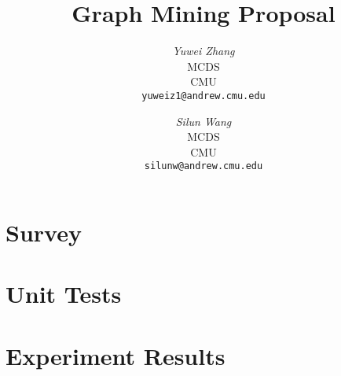 \documentclass[12pt]{article}
\begin{document}
\newcommand{\beq}{\begin{equation}}
\newcommand{\eeq}{\end{equation}}
\newcommand{\bit}{\begin{itemize*}}
\newcommand{\eit}{\end{itemize*}}
\newcommand{\goal}[1]{ {\noindent {$\Rightarrow$} \em {#1} } }
\newcommand{\hide}[1]{}
\newcommand{\comment}[1]{ {\footnotesize {#1} } }
\newtheorem{lemma}{Lemma}
\newtheorem{theorem}{Theorem}
\newtheorem{proof}{Proof}
\newtheorem{defn}{Definition}
\newtheorem{algo}{Algorithm}
\newtheorem{observation}{Observation}

\title{Graph Mining Proposal}


\author{ {\em Yuwei Zhang} \\
	    MCDS \\
	    CMU\\
	    {\tt yuweiz1@andrew.cmu.edu}
	 \and
	 {\em Silun Wang} \\
	     MCDS \\
	     CMU\\
	     {\tt silunw@andrew.cmu.edu}
}

\maketitle

\section{Survey}
    \label{sec:survey}
    


\section{Unit Tests}
    \label{sec:experiments}
    

\section{Experiment Results}
    \label{sec:conclusions}
    




\end{document}
